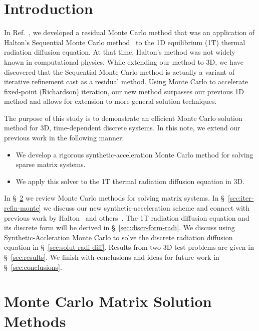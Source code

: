 \documentclass[preprint,12pt]{elsarticle}
\begin{document}
\section{Introduction}
\label{sec:introduction}

In Ref.~\cite{evans_2003}, we developed a residual Monte Carlo method
that was an application of Halton's Sequential Monte Carlo
method~\cite{halton_1962,halton_1994} to the 1D equilibrium (1T)
thermal radiation diffusion equation.  At that time, Halton's method
was not widely known in computational physics.  While extending our
method to 3D, we have discovered that the Sequential Monte Carlo
method is actually a variant of iterative refinement cast as a
residual method.  Using Monte Carlo to accelerate fixed-point
(Richardson) iteration, our new method surpasses our previous 1D
method and allows for extension to more general solution techniques.

The purpose of this study is to demonstrate an efficient Monte Carlo
solution method for 3D, time-dependent discrete systems.  In this
note, we extend our previous work in the following manner:
\begin{itemize}
\item We develop a rigorous synthetic-acceleration Monte Carlo method
  for solving sparse matrix systems.
\item We apply this solver to the 1T thermal radiation diffusion
  equation in 3D.
\end{itemize}
In \S~\ref{sec:monte-carlo-matrix} we review Monte Carlo methods for
solving matrix systems. In \S~\ref{sec:iter-refin-monte} we discuss
our new synthetic-acceleration scheme and connect with previous work
by Halton~\cite{halton_1994} and others~\cite{evans_2003}.  The 1T
radiation diffusion equation and its discrete form will be derived in
\S~\ref{sec:discr-form-radi}.  We discuss using Synthetic-Accleration
Monte Carlo to solve the discrete radiation diffusion equation in
\S~\ref{sec:solut-radi-diff}.  Results from two 3D test problems are
given in \S~\ref{sec:results}.  We finish with conclusions and ideas
for future work in \S~\ref{sec:conclusions}.

\section{Monte Carlo Matrix Solution Methods}
\label{sec:monte-carlo-matrix}
\end{document}

